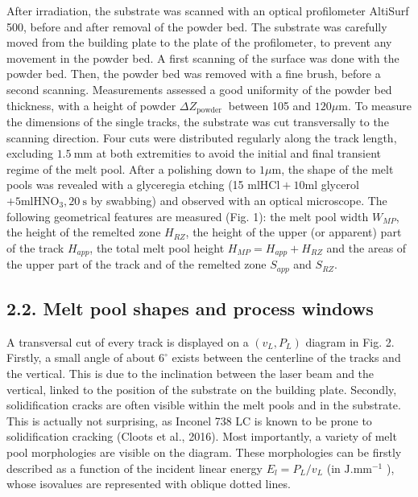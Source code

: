 \documentclass[10pt]{article}
\begin{document}
After irradiation, the substrate was scanned with an optical profilometer AltiSurf 500, before and after removal of the powder bed. The substrate was carefully moved from the building plate to the plate of the profilometer, to prevent any movement in the powder bed. A first scanning of the surface was done with the powder bed. Then, the powder bed was removed with a fine brush, before a second scanning. Measurements assessed a good uniformity of the powder bed thickness, with a height of powder $\Delta Z_{\text {powder }}$ between 105 and $120 \mu \mathrm{m}$. To measure the dimensions of the single tracks, the substrate was cut transversally to the scanning direction. Four cuts were distributed regularly along the track length, excluding $1.5 \mathrm{~mm}$ at both extremities to avoid the initial and final transient regime of the melt pool. After a polishing down to $1 \mu \mathrm{m}$, the shape of the melt pools was revealed with a glyceregia etching (15 $\mathrm{ml} \mathrm{HCl}+10 \mathrm{ml}$ glycerol $+5 \mathrm{ml} \mathrm{HNO}_{3}, 20 \mathrm{~s}$ by swabbing) and observed with an optical microscope. The following geometrical features are measured (Fig. 1): the melt pool width $W_{M P}$, the height of the remelted zone $H_{R Z}$, the height of the upper (or apparent) part of the track $H_{a p p}$, the total melt pool height $H_{M P}=H_{a p p}+H_{R Z}$ and the areas of the upper part of the track and of the remelted zone $S_{a p p}$ and $S_{R Z}$.

\subsection*{2.2. Melt pool shapes and process windows}
A transversal cut of every track is displayed on a $\left(v_{L}, P_{L}\right)$ diagram in Fig. 2. Firstly, a small angle of about $6^{\circ}$ exists between the centerline of the tracks and the vertical. This is due to the inclination between the laser beam and the vertical, linked to the position of the substrate on the building plate. Secondly, solidification cracks are often visible within the melt pools and in the substrate. This is actually not surprising, as Inconel 738 LC is known to be prone to solidification cracking (Cloots et al., 2016). Most importantly, a variety of melt pool morphologies are visible on the diagram. These morphologies can be firstly described as a function of the incident linear energy $E_{l}=P_{L} / v_{L}$ (in $\mathrm{J} . \mathrm{mm}^{-1}$ ), whose isovalues are represented with oblique dotted lines.
\end{document}
